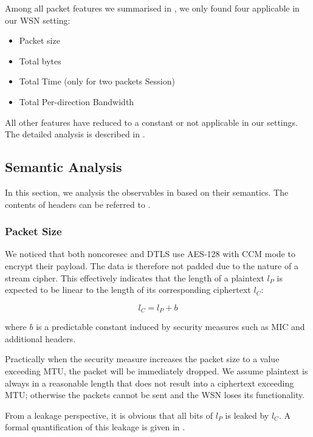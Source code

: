 Among all packet features we summarised in , we only found four applicable in our WSN setting:
\begin{itemize}
	\item Packet size
	\item Total bytes
	\item Total Time (only for two packets Session)
	\item Total Per-direction Bandwidth
\end{itemize}

All other features have reduced to a constant or not applicable in our settings. The detailed analysis is described in .

\subsection{Semantic Analysis}

In this section, we analysis the observables in  based on their semantics. The contents of headers can be referred to .

\subsubsection{Packet Size} \label{Semantic Packet Size}

We noticed that both noncoresec and DTLS use AES-128 with CCM mode to encrypt their payload. The data is therefore not padded due to the nature of a stream cipher. This effectively indicates that the length of a plaintext $l_P$ is expected to be linear to the length of its corresponding ciphertext $l_C$:

\begin{equation} \label{Eq: Linear Length}
	l_{C} = l_{P} + b
\end{equation}

where $b$ is a predictable constant induced by security measures such as MIC and additional headers.

Practically when the security measure increases the packet size to a value exceeding MTU, the packet will be immediately dropped. We assume plaintext is always in a reasonable length that does not result into a ciphertext exceeding MTU; otherwise the packets cannot be sent and the WSN loses its functionality.

From a leakage perspective, it is obvious that all bits of $l_P$ is leaked by $l_C$. A formal quantification of this leakage is given in .

